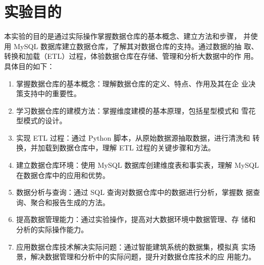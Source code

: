 \section{实验目的}
本实验的目的是通过实际操作掌握数据仓库的基本概念、建立方法和步骤，
并使用 MySQL 数据库建立数据仓库，了解其对数据仓库的支持。通过数据的抽
取、转换和加载（ETL）过程，体验数据仓库在存储、管理和分析大数据中的作
用。具体目的如下：
\begin{enumerate}
    \item 掌握数据仓库的基本概念：理解数据仓库的定义、特点、作用及其在企
    业决策支持中的重要性。
    \item 学习数据仓库的建模方法：掌握维度建模的基本原理，包括星型模式和
    雪花型模式的设计。
    \item 实现 ETL 过程：通过 Python 脚本，从原始数据源抽取数据，进行清洗和
    转换，并加载到数据仓库中，理解 ETL 过程的关键步骤和方法。
    \item 建立数据仓库环境：使用 MySQL 数据库创建维度表和事实表，理解
    MySQL 在数据仓库中的应用和优势。
    \item 数据分析与查询：通过 SQL 查询对数据仓库中的数据进行分析，掌握数
    据查询、聚合和报告生成的方法。
    \item 提高数据管理能力：通过实验操作，提高对大数据环境中数据管理、存
    储和分析的实际操作能力。
    \item 应用数据仓库技术解决实际问题：通过智能建筑系统的数据集，模拟真
    实场景，解决数据管理和分析中的实际问题，提升对数据仓库技术的应
    用能力。
\end{enumerate}